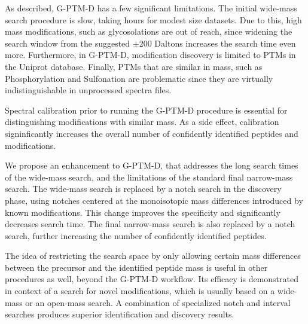 \documentclass[journal=jprobs,manuscript=article]{achemso}
\begin{document}
As described, G-PTM-D has a few significant limitations.
The initial wide-mass search procedure is slow, taking hours for modest size datasets.
Due to this, high mass modifications, such as glycosolations are out of reach, since widening the search window from the suggested $\pm 200$ Daltons increases the search time even more.
Furthermore, in G-PTM-D, modification discovery is limited to PTMs in the Uniprot database. 
Finally, PTMs that are similar in mass, such as Phosphorylation and Sulfonation are problematic since they are virtually indistinguishable in unprocessed spectra files. 

Spectral calibration prior to running the G-PTM-D procedure is essential for distinguishing modifications with similar mass.
As a side effect, calibration signinficantly increases the overall number of confidently identified peptides and modifications.

We propose an enhancement to G-PTM-D, that addresses the long search times of the wide-mass search, and the limitations of the standard final narrow-mass search.
The wide-mass search is replaced by a notch search in the discovery phase, using notches centered at the monoisotopic mass differences introduced by known modifications.
This change improves the specificity and significantly decreases search time.
The final narrow-mass search is also replaced by a notch search, further increasing the number of confidently identified peptides.

The idea of restricting the search space by only allowing certain mass differences between the precursor and the identified peptide mass is useful in other procedures as well, beyond the G-PTM-D workflow.
Its efficacy is demonstrated in context of a search for novel modifications, which is usually based on a wide-mass or an open-mass search.
A combination of specialized notch and interval searches produces superior identification and discovery results.
\end{document}
